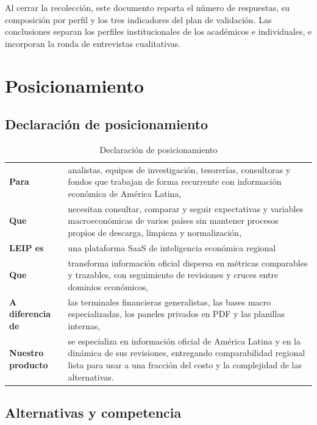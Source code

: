 \documentclass[11pt,a4paper]{article}
\newcommand{\proyectoNombre}{LEIP}
\begin{document}
Al cerrar la recolecci\'on, este documento reporta el n\'umero de respuestas, su
composici\'on por perfil y los tres indicadores del plan de validaci\'on. Las
conclusiones separan los perfiles institucionales de los acad\'emicos e
individuales, e incorporan la ronda de entrevistas cualitativas.

\section{Posicionamiento}

\subsection{Declaraci\'on de posicionamiento}

\begin{table}[htbp]
\centering
\begin{tabularx}{\textwidth}{>{\bfseries}l X}
\toprule
Para & analistas, equipos de investigaci\'on, tesorer\'ias, consultoras y fondos
que trabajan de forma recurrente con informaci\'on econ\'omica de Am\'erica Latina, \\
\addlinespace
Que & necesitan consultar, comparar y seguir expectativas y variables
macroecon\'omicas de varios pa\'ises sin mantener procesos propios de descarga,
limpieza y normalizaci\'on, \\
\addlinespace
\proyectoNombre{} es & una plataforma SaaS de inteligencia econ\'omica regional \\
\addlinespace
Que & transforma informaci\'on oficial dispersa en m\'etricas comparables y
trazables, con seguimiento de revisiones y cruces entre dominios econ\'omicos, \\
\addlinespace
A diferencia de & las terminales financieras generalistas, las bases macro
especializadas, los paneles privados en PDF y las planillas internas, \\
\addlinespace
Nuestro producto & se especializa en informaci\'on oficial de Am\'erica Latina y
en la din\'amica de sus revisiones, entregando comparabilidad regional lista
para usar a una fracci\'on del costo y la complejidad de las alternativas. \\
\bottomrule
\end{tabularx}
\caption{Declaraci\'on de posicionamiento}
\label{tab:posicionamiento}
\end{table}

\subsection{Alternativas y competencia}
\end{document}
